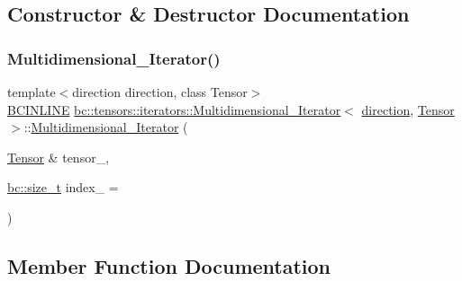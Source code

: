 \subsection{Constructor \& Destructor Documentation}
\mbox{\label{structbc_1_1tensors_1_1iterators_1_1Multidimensional__Iterator_ad1a73829a7e3eb32ef92915377d0b061}} 
\subsubsection{\texorpdfstring{Multidimensional\+\_\+\+Iterator()}{Multidimensional\_Iterator()}}
{\footnotesize\ttfamily template$<$direction direction, class Tensor$>$ \\
\hyperlink{common_8h_a6699e8b0449da5c0fafb878e59c1d4b1}{B\+C\+I\+N\+L\+I\+NE} \hyperlink{structbc_1_1tensors_1_1iterators_1_1Multidimensional__Iterator}{bc\+::tensors\+::iterators\+::\+Multidimensional\+\_\+\+Iterator}$<$ \hyperlink{namespacebc_1_1tensors_1_1iterators_ae76efe63fb9cb4985d5e4e6af0ebf296}{direction}, \hyperlink{namespacebc_a659391e47ab612be3ba6c18cf9c89159}{Tensor} $>$\+::\hyperlink{structbc_1_1tensors_1_1iterators_1_1Multidimensional__Iterator}{Multidimensional\+\_\+\+Iterator} (\begin{DoxyParamCaption}\item[{\hyperlink{namespacebc_a659391e47ab612be3ba6c18cf9c89159}{Tensor} \&}]{tensor\+\_\+,  }\item[{\hyperlink{namespacebc_aaf8e3fbf99b04b1b57c4f80c6f55d3c5}{bc\+::size\+\_\+t}}]{index\+\_\+ = {} }\end{DoxyParamCaption})\hspace{0.3cm}{\ttfamily [inline]}}



\subsection{Member Function Documentation}
\mbox{\label{structbc_1_1tensors_1_1iterators_1_1Multidimensional__Iterator_a26f81e587a02821c511c623b7b7072b5}} 
